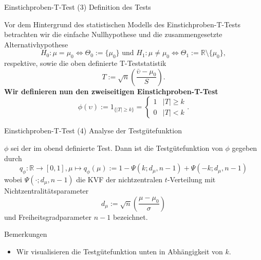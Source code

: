 \documentclass[
  8pt,
  ignorenonframetext,
]{beamer}
\providecommand{\tightlist}{%
  \setlength{\itemsep}{0pt}\setlength{\parskip}{0pt}}
\newcommand{\ups} {\upsilon}
\begin{document}
\begin{frame}{Einstichproben-T-Test \textbar{} (3) Definition des Tests}
\protect\hypertarget{einstichproben-t-test-3-definition-des-tests}{}
\vspace{5mm}

Vor dem Hintergrund des statistischen Modells des Einstichproben-T-Tests
betrachten wir die einfache Nullhypothese und die zusammengesetzte
Alternativhypothese \begin{equation}
H_0 : \mu = \mu_0 \Leftrightarrow \Theta_0 := \{\mu_0\}
\mbox{ und }
H_1 : \mu \neq \mu_0 \Leftrightarrow \Theta_1 := \mathbb{R} \setminus \{\mu_0\},
\end{equation} respektive, sowie die oben definierte T-Teststatistik
\begin{equation}
T := \sqrt{n}\left(\frac{\bar{\ups} - \mu_0}{S}\right).
\end{equation} \textbf{Wir definieren nun den zweiseitigen
Einstichproben-T-Test} \begin{equation}
\phi(\ups) := 1_{\{|T| \ge k\}} =
{\begin{cases}
1 & |T| \ge k \\
0 & |T|  <  k
\end{cases}}.
\end{equation}
\end{frame}

\begin{frame}{Einstichproben-T-Test \textbar{} (4) Analyse der
Testgütefunktion}
\protect\hypertarget{einstichproben-t-test-4-analyse-der-testguxfctefunktion}{}
\vspace{1cm}

\small
\begin{theorem}[Testgütefunktion]
\justifying
\normalfont
$\phi$ sei der im obend definierte Test. Dann ist die Testgütefunktion von $\phi$ gegeben durch
\begin{equation}
q_{\phi} : \mathbb{R} \to [0,1],
\mu \mapsto q_{\phi}(\mu)
:= 1 - \Psi(k;d_\mu,n-1) + \Psi(-k;d_\mu,n-1)
\end{equation}
wobei $\Psi(\cdot; d_\mu, n-1)$  die KVF der nichtzentralen $t$-Verteilung mit
Nichtzentralitätsparameter
\begin{equation}
d_\mu := \sqrt{n}\left(\frac{\mu - \mu_0}{\sigma}\right)
\end{equation}
und Freiheitsgradparameter $n-1$ bezeichnet.
\end{theorem}

Bemerkungen

\begin{itemize}
\tightlist
\item
  Wir visualisieren die Testgütefunktion unten in Abhängigkeit von
  \(k\).
\end{itemize}
\end{frame}
\end{document}
